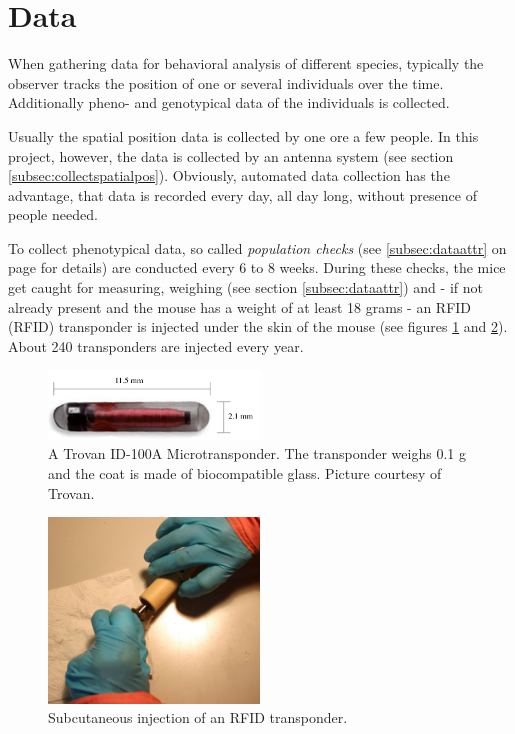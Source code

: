 \newpage
\section{Data}
\label{sec:datacollection}

When gathering data for behavioral analysis of different species, typically the observer tracks the position of one or several individuals over the time. Additionally pheno- and genotypical data of the individuals is collected.

Usually the spatial position data is collected by one ore a few people. In this project, however, the data is collected by an antenna system (see section \ref{subsec:collectspatialpos}). Obviously, automated data collection has the advantage, that data is recorded every day, all day long, without presence of people needed.

To collect phenotypical data, so called \textit{population checks} (see \ref{subsec:dataattr} on page \pageref{subsec:dataattr} for details) are conducted every 6 to 8 weeks. During these checks, the mice get caught for measuring, weighing (see section \ref{subsec:dataattr}) and - if not already present and the mouse has a weight of at least 18 grams - an \ac{RFID} (RFID) transponder is injected under the skin of the mouse (see figures \ref{fig:transponder} and \ref{fig:inject_rfid}). About 240 transponders are injected every year.

\begin{figure}[htpb]
\begin{center}
		\includegraphics[width=0.5\textwidth]{assets/pdf/transponder.pdf}
  		\caption[Trovan ID-100A Microtransponder]{A Trovan ID-100A Microtransponder. The transponder weighs 0.1 g and the coat is made of biocompatible glass. \footnotesize Picture courtesy of Trovan.}
  		\label{fig:transponder}
\end{center}
\end{figure}
\begin{figure}[htpb]
\begin{center}
		\includegraphics[width=0.5\textwidth]{assets/pdf/transponder_inject.pdf}
  		\caption[Injecting an RFID transponder]{Subcutaneous injection of an RFID transponder.}
  		\label{fig:inject_rfid}
\end{center}
\end{figure}

